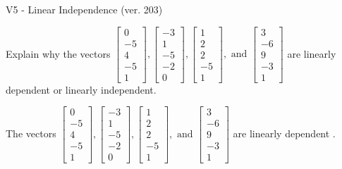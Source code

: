 \begin{exercise}
  \begin{exerciseTitle}V5 - Linear Independence (ver. 203)\end{exerciseTitle}
  \begin{exerciseStatement}
    Explain why the vectors \(\left[\begin{array}{r}
0 \\
-5 \\
4 \\
-5 \\
1
\end{array}\right] , \left[\begin{array}{r}
-3 \\
1 \\
-5 \\
-2 \\
0
\end{array}\right] , \left[\begin{array}{r}
1 \\
2 \\
2 \\
-5 \\
1
\end{array}\right] , \text{ and } \left[\begin{array}{r}
3 \\
-6 \\
9 \\
-3 \\
1
\end{array}\right]\) are linearly dependent or linearly independent.	


  \end{exerciseStatement}
  \begin{exerciseAnswer}
   The vectors \(\left[\begin{array}{r}
0 \\
-5 \\
4 \\
-5 \\
1
\end{array}\right] , \left[\begin{array}{r}
-3 \\
1 \\
-5 \\
-2 \\
0
\end{array}\right] , \left[\begin{array}{r}
1 \\
2 \\
2 \\
-5 \\
1
\end{array}\right] , \text{ and } \left[\begin{array}{r}
3 \\
-6 \\
9 \\
-3 \\
1
\end{array}\right]\) are 
  	 linearly dependent  .
  


  \end{exerciseAnswer}
\end{exercise}